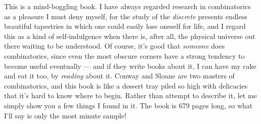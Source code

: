 \documentclass{article}
\begin{document}
This is a mind-boggling book. I have always regarded research in
combinatorics as a pleasure I must deny myself, for the study of the
\emph{discrete} presents endless beautiful tapestries in which one could
easily lose oneself for life, and I regard this as a kind of
self-indulgence when there is, after all, the physical universe out
there waiting to be understood. Of course, it's good that \emph{someone}
does combinatorics, since even the most obscure corners have a strong
tendency to become useful eventually --- and if they write books about
it, I can have my cake and eat it too, by \emph{reading} about it.
Conway and Sloane are two masters of combinatorics, and this book is
like a dessert tray piled so high with delicacies that it's hard to know
where to begin. Rather than attempt to describe it, let me simply show
you a few things I found in it. The book is 679 pages long, so what I'll
say is only the most minute sample!
\end{document}
